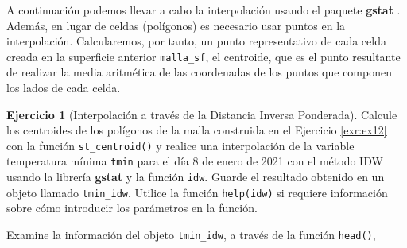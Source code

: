 \documentclass[
]{book}
\theoremstyle{definition}
\theoremstyle{definition}
\theoremstyle{definition}
\newtheorem{exercise}{Ejercicio}[chapter]
\theoremstyle{definition}
\theoremstyle{remark}
\begin{document}
A continuación podemos llevar a cabo la interpolación usando el paquete
\textbf{gstat} \citep{R-gstat}. Además, en lugar de celdas (polígonos) es necesario usar
puntos en la interpolación. Calcularemos, por tanto, un punto representativo de
cada celda creada en la superficie anterior \texttt{malla\_sf}, el centroide, que es el
punto resultante de realizar la media aritmética de las coordenadas de los
puntos que componen los lados de cada celda.

\begin{exercise}[Interpolación a través de la Distancia Inversa Ponderada]
\protect\hypertarget{exr:ex13}{}\label{exr:ex13}Calcule los centroides de los polígonos de la malla construida en el Ejercicio
\ref{exr:ex12} con la función \texttt{st\_centroid()} y realice una interpolación de la
variable temperatura mínima \texttt{tmin} para el día 8 de enero de 2021 con el método
IDW usando la librería \textbf{gstat} y la función \texttt{idw}. Guarde el resultado
obtenido en un objeto llamado \texttt{tmin\_idw}. Utilice la función \texttt{help(idw)} si
requiere información sobre cómo introducir los parámetros en la función.

Examine la información del objeto \texttt{tmin\_idw}, a través de la función \texttt{head()},
\end{exercise}
\end{document}
